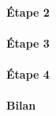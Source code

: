 \documentclass[./standalone.tex]{subfiles}
\begin{document}
\paragraph{Étape 2\\}

\paragraph{Étape 3\\}

\paragraph{Étape 4\\}

\paragraph{Bilan\\}
\end{document}
